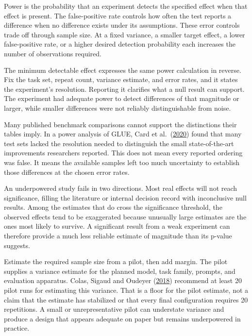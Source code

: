 Power is the probability that an experiment detects the specified effect when that effect is present. The false-positive rate controls how often the test reports a difference when no difference exists under its assumptions. These error controls trade off through sample size. At a fixed variance, a smaller target effect, a lower false-positive rate, or a higher desired detection probability each increases the number of observations required.

The minimum detectable effect expresses the same power calculation in reverse. Fix the task set, repeat count, variance estimate, and error rates, and it states the experiment's resolution. Reporting it clarifies what a null result can support. The experiment had adequate power to detect differences of that magnitude or larger, while smaller differences were not reliably distinguishable from noise.

Many published benchmark comparisons cannot support the distinctions their tables imply. In a power analysis of GLUE, Card et al.~(\href{https://arxiv.org/abs/2010.06595}{2020}) found that many test sets lacked the resolution needed to distinguish the small state-of-the-art improvements researchers reported. This does not mean every reported ordering was false. It means the available samples left too much uncertainty to establish those differences at the chosen error rates.

An underpowered study fails in two directions. Most real effects will not reach significance, filling the literature or internal decision record with inconclusive null results. Among the estimates that do cross the significance threshold, the observed effects tend to be exaggerated because unusually large estimates are the ones most likely to survive. A significant result from a weak experiment can therefore provide a much less reliable estimate of magnitude than its p-value suggests.

Estimate the required sample size from a pilot, then add margin. The pilot supplies a variance estimate for the planned model, task family, prompts, and evaluation apparatus. Colas, Sigaud and Oudeyer (\href{https://arxiv.org/abs/1806.08295}{2018}) recommend at least 20 pilot runs for estimating this variance. That is a floor for the pilot estimate, not a claim that the estimate has stabilized or that every final configuration requires 20 repetitions. A small or unrepresentative pilot can understate variance and produce a design that appears adequate on paper but remains underpowered in practice.


